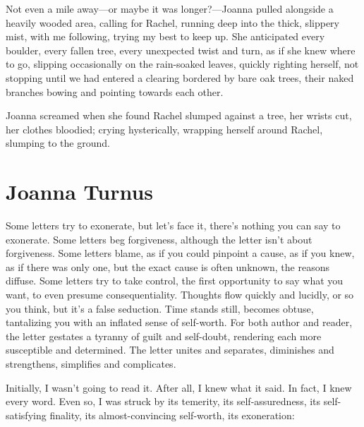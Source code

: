 Not even a mile away---or maybe it was longer?---Joanna pulled alongside
a heavily wooded area, calling for Rachel, running deep into the thick,
slippery mist, with me following, trying my best to keep up. She
anticipated every boulder, every fallen tree, every unexpected twist and
turn, as if she knew where to go, slipping occasionally on the
rain-soaked leaves, quickly righting herself, not stopping until we had
entered a clearing bordered by bare oak trees, their naked branches
bowing and pointing towards each other.

Joanna screamed when she found Rachel slumped against a tree, her wrists
cut, her clothes bloodied; crying hysterically, wrapping herself around
Rachel, slumping to the ground.

\chapter{Joanna Turnus}

\titlemark

Some letters try to exonerate, but let's face it, there's nothing you
can say to exonerate. Some letters beg forgiveness, although the letter
isn't about forgiveness. Some letters blame, as if you could pinpoint a
cause, as if you knew, as if there was only one, but the exact cause is
often unknown, the reasons diffuse. Some letters try to take control,
the first opportunity to say what you want, to even presume
consequentiality. Thoughts flow quickly and lucidly, or so you think,
but it's a false seduction. Time stands still, becomes obtuse,
tantalizing you with an inflated sense of self-worth. For both author
and reader, the letter gestates a tyranny of guilt and self-doubt,
rendering each more susceptible and determined. The letter unites and
separates, diminishes and strengthens, simplifies and complicates.

Initially, I wasn't going to read it. After all, I knew what it said. In
fact, I knew every word. Even so, I was struck by its temerity, its
self-assuredness, its self-satisfying finality, its almost-convincing
self-worth, its exoneration:

